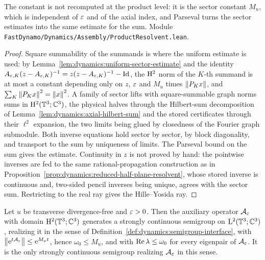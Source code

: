 The constant is not recomputed at the product level: it is the sector constant $M_u $, which
is independent of $\varepsilon $ and of the axial index, and Parseval turns the sector estimates
into the same estimate for the sum.  Module
\texttt{FastDynamo/Dynamics/Assembly/ProductResolvent.lean}.

\begin{proof}
  \leanok
  Square summability of the summands is where the uniform estimate is used: by
  Lemma~\ref{lem:dynamics:uniform-sector-estimate} and the identity
  $A_{\varepsilon,K}(z-A_{\varepsilon,K})^{-1}=z(z-A_{\varepsilon,K})^{-1}-\mathrm{Id} $, the $\mathrm{H}^2 $ norm of the
  $K $-th summand is at most a constant depending only on $z $, $\varepsilon $ and $M_u $ times
  $\left\|P_Kx\right\| $, and $\sum_K\left\|P_Kx\right\|^2=\left\|x\right\|^2 $.  A family of sector lifts with square-summable graph
  norms sums in $\mathrm{H}^2(\mathbb{T}^3;\mathbb{C}^3) $, the physical halves through the Hilbert-sum
  decomposition of Lemma~\ref{lem:dynamics:axial-hilbert-sum} and the stored certificates
  through their $\ell^2 $ expansion, the two limits being glued by closedness of the Fourier
  graph submodule.  Both inverse equations hold sector by sector, by block diagonality, and
  transport to the sum by uniqueness of limits.  The Parseval bound on the sum gives the
  estimate.  Continuity in $z $ is not proved by hand: the pointwise inverses are fed to the
  same rational-propagation construction as in
  Proposition~\ref{prop:dynamics:reduced-half-plane-resolvent}, whose stored inverse is
  continuous and, two-sided pencil inverses being unique, agrees with the sector sum.
  Restricting to the real ray gives the Hille--Yosida ray.
\end{proof}

\begin{theorem}
  \label{thm:dynamics:product-semigroup}
  \leanok
  Let $u $ be transverse divergence-free and $\varepsilon>0 $.  Then the auxiliary operator
  $\mathcal A_\varepsilon $ with domain $\mathrm{H}^2(\mathbb{T}^3;\mathbb{C}^3) $ generates a strongly continuous
  semigroup on $\mathrm{L}^2(\mathbb{T}^3;\mathbb{C}^3) $, realizing it in the sense of
  Definition~\ref{def:dynamics:semigroup-interface}, with
  $\left\|\mathrm{e}^{t\mathcal A_\varepsilon}\right\|\leq\mathrm{e}^{M_ut} $, hence
  $\omega_0\leq M_u $, and with $\operatorname{Re}\lambda\leq\omega_0 $ for every eigenpair of
  $\mathcal A_\varepsilon $.  It is the only strongly continuous semigroup realizing
  $\mathcal A_\varepsilon $ in this sense.
\end{theorem}

